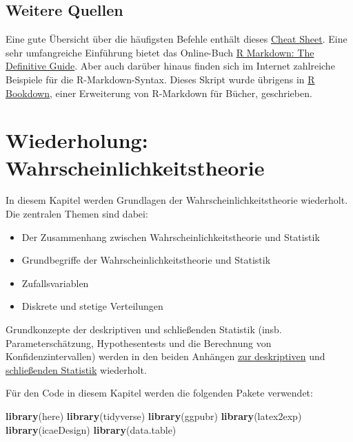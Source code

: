 \documentclass[]{book}
\newenvironment{Shaded}{\begin{snugshade}}{\end{snugshade}}
\newcommand{\KeywordTok}[1]{\textcolor[rgb]{0.13,0.29,0.53}{\textbf{#1}}}
\newcommand{\NormalTok}[1]{#1}
\providecommand{\tightlist}{%
  \setlength{\itemsep}{0pt}\setlength{\parskip}{0pt}}
\begin{document}
\section{Weitere Quellen}\label{weitere-quellen}

Eine gute Übersicht über die häufigsten Befehle enthält dieses
\href{https://rstudio.com/wp-content/uploads/2016/03/rmarkdown-cheatsheet-2.0.pdf}{Cheat
Sheet}. Eine sehr umfangreiche Einführung bietet das Online-Buch
\href{https://bookdown.org/yihui/rmarkdown/}{R Markdown: The Definitive
Guide}. Aber auch darüber hinaus finden sich im Internet zahlreiche
Beispiele für die R-Markdown-Syntax. Dieses Skript wurde übrigens in
\href{https://bookdown.org/yihui/bookdown/}{R Bookdown}, einer
Erweiterung von R-Markdown für Bücher, geschrieben.

\hypertarget{stat-stoch}{\chapter{Wiederholung:
Wahrscheinlichkeitstheorie}\label{stat-stoch}}

In diesem Kapitel werden Grundlagen der Wahrscheinlichkeitstheorie
wiederholt. Die zentralen Themen sind dabei:

\begin{itemize}
\tightlist
\item
  Der Zusammenhang zwischen Wahrscheinlichkeitstheorie und Statistik
\item
  Grundbegriffe der Wahrscheinlichkeitstheorie und Statistik
\item
  Zufallsvariablen
\item
  Diskrete und stetige Verteilungen
\end{itemize}

Grundkonzepte der deskriptiven und schließenden Statistik (insb.
Parameterschätzung, Hypothesentests und die Berechnung von
Konfidenzintervallen) werden in den beiden Anhängen
\protect\hyperlink{desk-stat}{zur deskriptiven} und
\protect\hyperlink{stat-rep}{schließenden Statistik} wiederholt.

Für den Code in diesem Kapitel werden die folgenden Pakete verwendet:

\begin{Shaded}
\begin{Highlighting}[]
\KeywordTok{library}\NormalTok{(here)}
\KeywordTok{library}\NormalTok{(tidyverse)}
\KeywordTok{library}\NormalTok{(ggpubr)}
\KeywordTok{library}\NormalTok{(latex2exp)}
\KeywordTok{library}\NormalTok{(icaeDesign)}
\KeywordTok{library}\NormalTok{(data.table)}
\end{Highlighting}
\end{Shaded}
\end{document}
